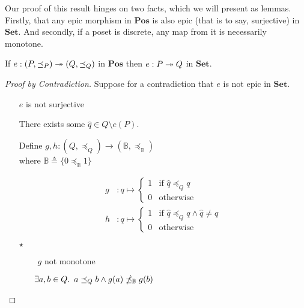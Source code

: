 Our proof of this result hinges on two facts, which we will present as lemmas. Firstly, that any epic morphism in $\mathbf{Pos}$ is also epic (that is to say, surjective) in $\mathbf{Set}$. And secondly, if a poset is discrete, any map from it is necessarily monotone.

\begin{lemma}
  If $e : (P, \preceq_P) \twoheadrightarrow (Q, \preceq_Q)$ in $\mathbf{Pos}$ then $e : P \twoheadrightarrow Q$ in $\mathbf{Set}$.

  \begin{proof}[Proof by Contradiction]
    Suppose for a contradiction that $e$ is not epic in $\mathbf{Set}$.

    \begin{itemize}
      \item[\iffs] $e$ is not surjective

      \item[\imps] There exists some $\hat{q}\in Q\setminus e(P)$.

      \addtolength{\itemsep}{.5\baselineskip}
      \item[\phs]
        Define $g, h : (Q, \preceq_Q) \to (\mathbb{B}, \preceq_{\mathbb{B}})$\\
        where $\mathbb{B}\triangleq\{0 \preceq_{\mathbb{B}} 1\}$

        \begin{align*}
          g & : q \mapsto
          \begin{cases}
            1 & \text{if }\hat{q}\preceq_Q q\\
            0 & \text{otherwise}
          \end{cases}\\
          h & : q \mapsto
          \begin{cases}
            1 & \text{if }\hat{q}\preceq_Q q\wedge\hat{q}\neq q\\
            0 & \text{otherwise}
          \end{cases}
        \end{align*}

      \addtolength{\itemsep}{-.5\baselineskip}
      \item[$\star$]
        \begin{itemize}
          \item[\phs]\Ass~$g$ not monotone
            \marginnote{\Hyp}

          \item[\imps]
            $\exists a, b\in Q\ldotp~a\preceq_Qb\wedge g(a)\npreceq_{\mathbb{B}}g(b)$


\end{itemize}
\end{itemize}
\end{proof}
\end{lemma}
